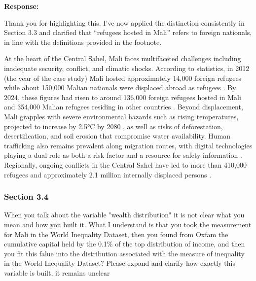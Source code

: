 \documentclass[11pt,a4paper]{article}
\begin{document}
\textbf{Response:}

Thank you for highlighting this. I've now applied the distinction consistently in Section 3.3 and clarified that “refugees hosted in Mali” refers to foreign nationals, in line with the definitions provided in the footnote.

\vspace{0.5cm}

\begin{updatebox}

At the heart of the Central Sahel, Mali faces multifaceted challenges including inadequate security, conflict, and 
climatic shocks. According to \citet{unhcr_refugee_statistics_2025} statistics, in 2012 (the year of the case study) 
Mali hosted approximately 14,000 foreign refugees while about 150,000 Malian nationals were displaced abroad as refugees 
\citep{unhcr_mali}. By 2024, these figures had risen to around 136,000 foreign refugees hosted in Mali and 354,000 Malian 
refugees residing in other countries \citep{unhcr_mali}. Beyond displacement, Mali grapples with severe environmental 
hazards such as rising temperatures, projected to increase by 2.5°C by 2080 \citep{76-wachiaya2021warming}, as well as 
risks of deforestation, desertification, and soil erosion that compromise water availability. Human trafficking also 
remains prevalent along migration routes, with digital technologies playing a dual role as both a risk factor and a 
resource for safety information \citep{UNHCR2022Trafficking}. Regionally, ongoing conflicts in the Central Sahel have 
led to more than 410,000 refugees and approximately 2.1 million internally displaced persons 
\citep{80-cheshirkov2022decade}.

\end{updatebox}

\vspace{0.5cm}

\subsubsection*{Section 3.4}

\begin{reviewbox}
When you talk about the variable "wealth distribution" it is not clear what you mean and how you built it. What I understand is that you took the measurement for Mali in the World Inequality Dataset, then you found from Oxfam the cumulative capital held by the 0.1\% of the top distribution of income, and then you fit this falue into the distribution associated with the measure of inequality in the World Inequality Dataset? Please expand and clarify how exactly this variable is built, it remains unclear
\end{reviewbox}
\end{document}
